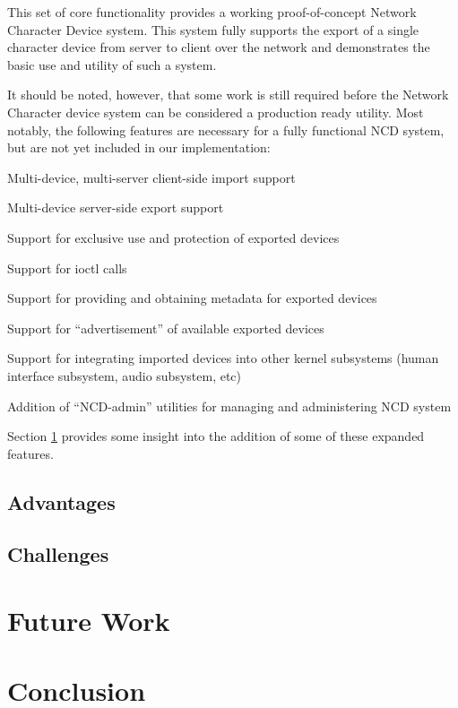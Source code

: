\documentclass[11pt,twocolumn]{article}
\newenvironment{packed_item}{
\begin{itemize}
  \setlength{\itemsep}{1pt}
  \setlength{\parskip}{0pt}
  \setlength{\parsep}{0pt}
}{\end{itemize}}
\begin{document}
This set of core functionality provides a working proof-of-concept
Network Character Device system. This system fully supports the
export of a single character device from server to client over the
network and demonstrates the basic use and utility of such a system.

It should be noted, however, that some work is still required before
the Network Character device system can be considered a production
ready utility. Most notably, the following features are necessary for
a fully functional NCD system, but are not yet included in our
implementation:

\begin{packed_item}
\item Multi-device, multi-server client-side import support
\item Multi-device server-side export support
\item Support for exclusive use and protection of exported devices
\item Support for ioctl calls
\item Support for providing and obtaining metadata for exported
  devices
\item Support for ``advertisement'' of available exported devices
\item Support for integrating imported devices into other kernel
  subsystems (human interface subsystem, audio subsystem, etc)
\item Addition of ``NCD-admin'' utilities for managing and administering
  NCD system
\end{packed_item}

Section \ref{sec:futurework} provides some insight into the addition
of some of these expanded features.

\subsection{Advantages}
\label{sec:advantages}

\subsection{Challenges}
\label{sec:challenges}

\section{Future Work}
\label{sec:futurework}

\section{Conclusion}
\label{sec:conclusion}


\end{document}
